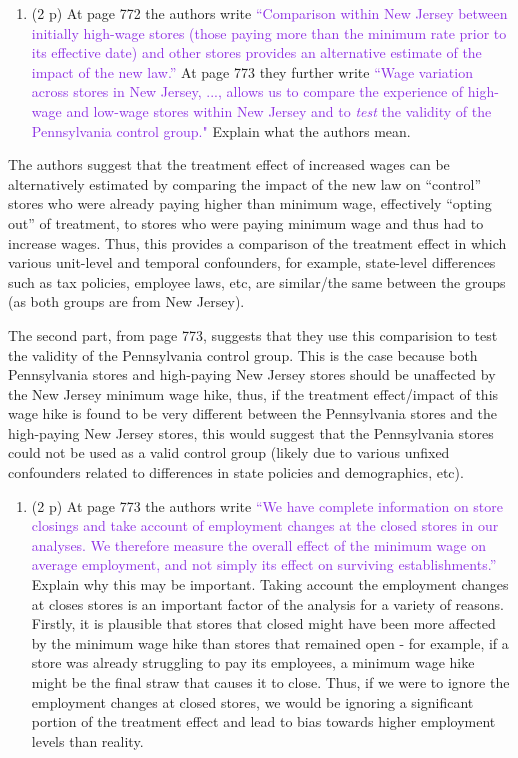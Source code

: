 \documentclass[
]{article}
\providecommand{\tightlist}{%
  \setlength{\itemsep}{0pt}\setlength{\parskip}{0pt}}
\begin{document}
\begin{enumerate}
\def\labelenumi{\arabic{enumi}.}
\setcounter{enumi}{19}
\tightlist
\item
  (2 p) At page 772 the authors write
  \textcolor{BlueViolet}{``Comparison within New Jersey between initially high-wage stores (those paying more than the minimum rate prior to its effective date) and other stores provides an alternative estimate of the impact of the new law.''}
  At page 773 they further write
  \textcolor{BlueViolet}{``Wage variation across stores in New Jersey, ..., allows us to compare the experience of high-wage and low-wage stores within New Jersey and to \textit{test} the validity of the Pennsylvania control group."}
  Explain what the authors mean.
\end{enumerate}

The authors suggest that the treatment effect of increased wages can be
alternatively estimated by comparing the impact of the new law on
``control'' stores who were already paying higher than minimum wage,
effectively ``opting out'' of treatment, to stores who were paying
minimum wage and thus had to increase wages. Thus, this provides a
comparison of the treatment effect in which various unit-level and
temporal confounders, for example, state-level differences such as tax
policies, employee laws, etc, are similar/the same between the groups
(as both groups are from New Jersey).

The second part, from page 773, suggests that they use this comparision
to test the validity of the Pennsylvania control group. This is the case
because both Pennsylvania stores and high-paying New Jersey stores
should be unaffected by the New Jersey minimum wage hike, thus, if the
treatment effect/impact of this wage hike is found to be very different
between the Pennsylvania stores and the high-paying New Jersey stores,
this would suggest that the Pennsylvania stores could not be used as a
valid control group (likely due to various unfixed confounders related
to differences in state policies and demographics, etc).

\begin{enumerate}
\def\labelenumi{\arabic{enumi}.}
\setcounter{enumi}{20}
\tightlist
\item
  (2 p) At page 773 the authors write
  \textcolor{BlueViolet}{``We have complete information on store closings and take account of employment changes at the closed stores in our analyses. We therefore measure the overall effect of the minimum wage on average employment, and not simply its effect on surviving establishments.''}
  Explain why this may be important. Taking account the employment
  changes at closes stores is an important factor of the analysis for a
  variety of reasons. Firstly, it is plausible that stores that closed
  might have been more affected by the minimum wage hike than stores
  that remained open - for example, if a store was already struggling to
  pay its employees, a minimum wage hike might be the final straw that
  causes it to close. Thus, if we were to ignore the employment changes
  at closed stores, we would be ignoring a significant portion of the
  treatment effect and lead to bias towards higher employment levels
  than reality.
\end{enumerate}
\end{document}
